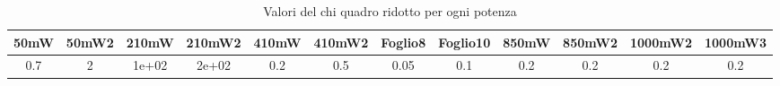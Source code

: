 \begin{table}[h!]
\centering
\begin{tabular}{|c|c|c|c|c|c|c|c|c|c|c|c|}
\hline
50mW & 50mW2 & 210mW & 210mW2 & 410mW & 410mW2 & Foglio8 & Foglio10 & 850mW & 850mW2 & 1000mW2 & 1000mW3 \\
\hline
0.7 & 2 & 1e+02 & 2e+02 & 0.2 & 0.5 & 0.05 & 0.1 & 0.2 & 0.2 & 0.2 & 0.2 \\
\hline
\end{tabular}
\caption{Valori del chi quadro ridotto per ogni potenza}
\end{table}